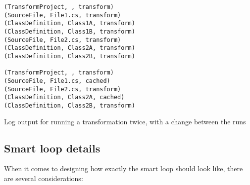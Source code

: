 \begin{listing}
\begin{verbatim}
(TransformProject, , transform)
(SourceFile, File1.cs, transform)
(ClassDefinition, Class1A, transform)
(ClassDefinition, Class1B, transform)
(SourceFile, File2.cs, transform)
(ClassDefinition, Class2A, transform)
(ClassDefinition, Class2B, transform)

(TransformProject, , transform)
(SourceFile, File1.cs, cached)
(SourceFile, File2.cs, transform)
(ClassDefinition, Class2A, cached)
(ClassDefinition, Class2B, transform)
\end{verbatim}
\caption{Log output for running a transformation twice, with a change between the runs}
\label{csharpetransform-log}
\end{listing}

\subsection{Smart loop details}

When it comes to designing how exactly the smart  loop should look like, there are several considerations:

